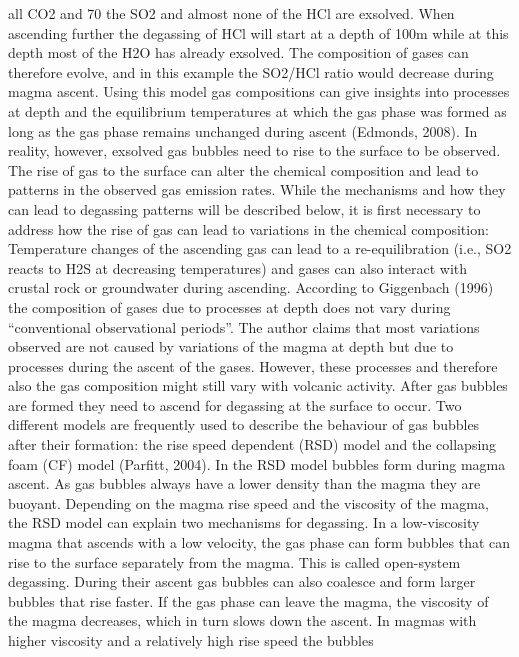 \documentclass  [
  paper    = a4,
  BCOR     = 10mm,
  twoside,
  fontsize = 12pt,
  fleqn,
  toc      = bibnumbered,
  toc      = listofnumbered,
  numbers  = noendperiod,
  headings = normal,
  listof   = leveldown,
  version  = 3.03
]                                       {scrreprt}
\begin{document}
	all CO2 and 70%
	the SO2 and almost none of the HCl are exsolved. When ascending further the
	degassing of HCl will start at a depth of 100m while at this depth most of the
	H2O has already exsolved. The composition of gases can therefore evolve, and
	in this example the SO2/HCl ratio would decrease during magma ascent. Using
	this model gas compositions can give insights into processes at depth and the
	equilibrium temperatures at which the gas phase was formed as long as the gas
	phase remains unchanged during ascent (Edmonds, 2008).
	In reality, however, exsolved gas bubbles need to rise to the surface to be
	observed. The rise of gas to the surface can alter the chemical composition
	and lead to patterns in the observed gas emission rates. While the mechanisms
	and how they can lead to degassing patterns will be described below, it is
	first necessary to address how the rise of gas can lead to variations in the
	chemical composition: Temperature changes of the ascending gas can lead to a
	re-equilibration (i.e., SO2 reacts to H2S at decreasing temperatures) and gases
	can also interact with crustal rock or groundwater during ascending. According
	to Giggenbach (1996) the composition of gases due to processes at depth does
	not vary during “conventional observational periods”. The author claims that
	most variations observed are not caused by variations of the magma at depth
	but due to processes during the ascent of the gases. However, these processes
	and therefore also the gas composition might still vary with volcanic activity.
	After gas bubbles are formed they need to ascend for degassing at the surface
	to occur. Two different models are frequently used to describe the behaviour
	of gas bubbles after their formation: the rise speed dependent (RSD) model
	and the collapsing foam (CF) model (Parfitt, 2004). In the RSD model bubbles
	form during magma ascent. As gas bubbles always have a lower density than the
	magma they are buoyant. Depending on the magma rise speed and the viscosity
	of the magma, the RSD model can explain two mechanisms for degassing.
	In a low-viscosity magma that ascends with a low velocity, the gas phase can
	form bubbles that can rise to the surface separately from the magma. This is
	called open-system degassing. During their ascent gas bubbles can also coalesce
	and form larger bubbles that rise faster. If the gas phase can leave the magma,
	the viscosity of the magma decreases, which in turn slows down the ascent.
	In magmas with higher viscosity and a relatively high rise speed the bubbles
\end{document}
